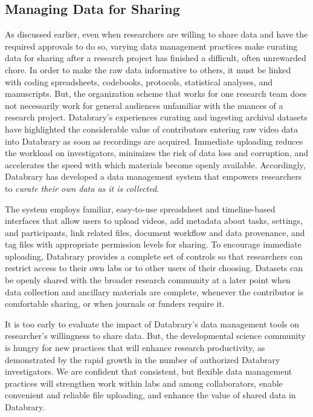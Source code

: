 \documentclass[letterpaper,man,apacite]{apa6}
\begin{document}
\subsection{Managing Data for Sharing}

As discussed earlier, even when researchers are willing to share data and have the required approvals to do so, varying data management practices make curating data for sharing after a research project has finished a difficult, often unrewarded chore.
In order to make the raw data informative to others, it must be linked with coding spreadsheets, codebooks, protocols, statistical analyses, and manuscripts.
But, the organization scheme that works for one research team does not necessarily work for general audiences unfamiliar with the nuances of a research project.
Databrary's experiences curating and ingesting archival datasets have highlighted the considerable value of contributors entering raw video data into Databrary as soon as recordings are acquired. 
Immediate uploading reduces the workload on investigators, minimizes the risk of data loss and corruption, and accelerates the speed with which materials become openly available. 
Accordingly, Databrary has developed a data management system that empowers researchers to \emph{curate their own data as it is collected}.

The system employs familiar, easy-to-use spreadsheet and timeline-based interfaces that allow users to upload videos, add metadata about tasks, settings, and participants, link related files, document workflow and data provenance, and tag files with appropriate permission levels for sharing. 
To encourage immediate uploading, Databrary provides a complete set of controls so that researchers can restrict
access to their own labs or to other users of their choosing. 
Datasets can be openly shared with the broader research community at a later point when data collection and ancillary materials are complete, whenever the contributor is comfortable sharing, or when journals or funders require it. 

It is too early to evaluate the impact of Databrary's data management tools on researcher's willingness to share data.
But, the developmental science community is hungry for new practices that will enhance research productivity, as demonstrated by the rapid growth in the number of authorized Databrary investigators.
We are confident that consistent, but flexible data management practices will strengthen work within labs and among collaborators, enable convenient and reliable file uploading, and enhance the value of shared data in Databrary.
\end{document}
